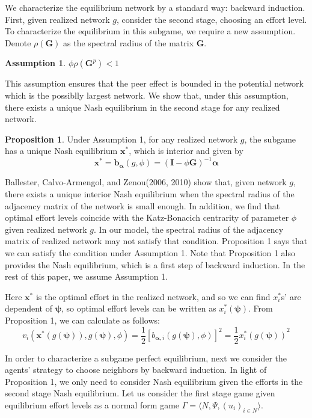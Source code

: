 \documentclass[12pt]{article}
\theoremstyle{definition}
\newtheorem{proposition}{Proposition}
\newtheorem{assumption}{Assumption}
\newcommand{\bm}[1]{\boldsymbol{#1}}
\begin{document}
We characterize the equilibrium network by a standard way: backward induction.
First, given realized network $g$, consider the second stage, choosing an effort level.
To characterize the equilibrium in this subgame, we require a new assumption.
Denote $\rho (\bm{G})$ as the spectral radius of the matrix $\bm{G}$.

\begin{assumption}
$\phi \rho(\bm{G}^p) < 1$
\end{assumption}

This assumption ensures that the peer effect is bounded in the potential network which is the possiblly largest network.
We show that, under this assumption, there exists a unique Nash equilibrium in the second stage for any realized network.

\begin{proposition}
Under Assumption 1, for any realized network $g$, the subgame has a unique Nash equilibrium $\bm{x}^*$, which is interior and given by
\[ \bm{x}^* = \bm{b}_{\bm{\alpha}}(g, \phi) = {(\bm{I} - \phi \bm{G})}^{-1} \bm{\alpha} \]
\end{proposition}

Ballester, Calvo-Armengol, and Zenou(2006, 2010) show that, given network $g$, there exists a unique interior Nash equilibrium when the spectral radius of the adjacency matrix of the network is small enough.
In addition, we find that optimal effort levels coincide with the Katz-Bonacich centrarity of parameter $\phi$ given realized network $g$.
In our model, the spectral radius of the adjacency matrix of realized network may not satisfy that condition.
Proposition 1 says that we can satisfy the condition under Assumption 1.
Note that Proposition 1 also provides the Nash equilibrium, which is a first step of backward induction.
In the rest of this paper, we assume Assumption 1.

Here $\bm{x}^*$ is the optimal effort in the realized network, and so we can find $x_i^*$s' are dependent of $\bm{\psi}$, so optimal effort levels can be written as $x_i^*(\bm{\psi})$.
From Proposition 1, we can calculate as follows:
\begin{equation}
	\label{opteff}
	v_i(\bm{x}^*(g(\bm{\psi})), g(\bm{\psi}), \phi) = \frac{1}{2} {[b_{\bm{\alpha}, i}(g(\bm{\psi}), \phi)]}^2 = \frac{1}{2} {x_i^*(g(\bm{\psi}))}^2
\end{equation}

In order to characterize a subgame perfect equilibrium, next we consider the agents' strategy to choose neighbors by backward induction.
In light of Proposition 1, we only need to consider Nash equilibrium given the efforts in the second stage Nash equilibrium.
Let us consider the first stage game given equilibrium effort levels as a normal form game $\Gamma = \langle N, \Psi, {(u_i)}_{i \in N} \rangle$.
\end{document}
